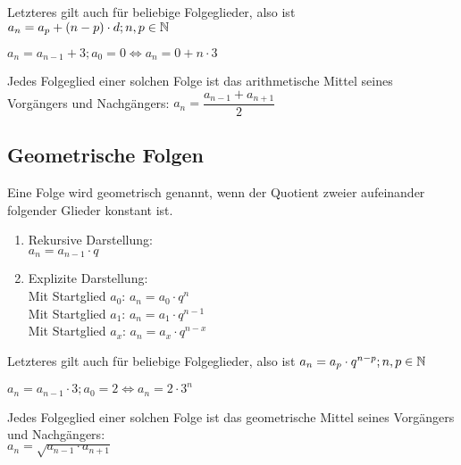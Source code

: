 \begin{Bemerkung}
Letzteres gilt auch für beliebige Folgeglieder, also ist $a_{n}=a_{p}+(n-p)\cdot d;n,p\in\mathbb{N}$
\end{Bemerkung}

\begin{Beispiel}
$a_{n}=a_{n-1}+3;a_{0}=0\Leftrightarrow a_{n}=0+n\cdot3$
\end{Beispiel}

\begin{Bemerkung}
Jedes Folgeglied einer solchen Folge ist das arithmetische Mittel seines Vorgängers und Nachgängers: $a_{n}=\dfrac{a_{n-1}+a_{n+1}}{2}$
\end{Bemerkung}

	\subsection{Geometrische Folgen}

\begin{Definition}
Eine Folge wird geometrisch genannt, wenn der Quotient zweier aufeinander folgender Glieder konstant ist.
\begin{enumerate}
\item Rekursive Darstellung:\\
\indent $a_{n}=a_{n-1}\cdot q$
\item Explizite Darstellung:\\
\indent Mit Startglied $a_{0}$: $a_{n}=a_{0}\cdot q^n$\\
\indent Mit Startglied $a_{1}$: $a_{n}=a_{1}\cdot q^{n-1}$\\
\indent Mit Startglied $a_{x}$: $a_{n}=a_{x}\cdot q^{n-x}$\\
\end{enumerate}
\end{Definition}

\begin{Bemerkung}
Letzteres gilt auch für beliebige Folgeglieder, also ist $a_{n}=a_{p}\cdot q^{n-p};n,p\in\mathbb{N}$
\end{Bemerkung}

\begin{Beispiel}
$a_{n}=a_{n-1}\cdot3;a_{0}=2\Leftrightarrow a_{n}=2\cdot3^n$
\end{Beispiel}

\begin{Bemerkung}
Jedes Folgeglied einer solchen Folge ist das geometrische Mittel seines Vorgängers und Nachgängers:\\
 $a_{n}=\sqrt{a_{n-1}\cdot a_{n+1}}$
\end{Bemerkung}

